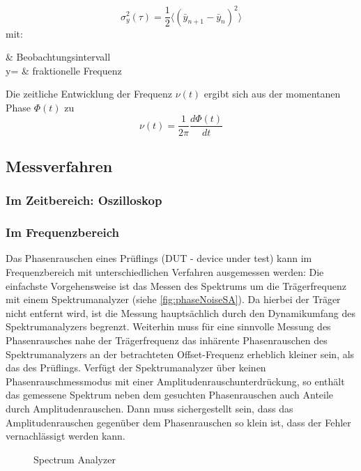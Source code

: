 \begin{equation}
	\sigma_y^2(\tau)=\frac{1}{2} \Big\langle(\bar{y}_{n+1}-\bar{y}_{n})^2\Big\rangle
\end{equation}
mit:
\begin{with*}
	\tau & Beobachtungsintervall \\
	y= & fraktionelle Frequenz \\
\end{with*}

Die zeitliche Entwicklung der Frequenz $\nu(t)$ ergibt sich aus der momentanen Phase $\Phi(t)$ zu 
\begin{equation}
	\nu(t)=\frac{1}{2\pi} \frac{d\Phi(t)}{dt}
\end{equation}


\subsection{Messverfahren}

\subsubsection{Im Zeitbereich: Oszilloskop}

\subsubsection{Im Frequenzbereich}
Das Phasenrauschen eines Prüflings (DUT - device under test) kann im Frequenzbereich mit unterschiedlichen Verfahren ausgemessen werden: Die einfachste Vorgehensweise ist das Messen des Spektrums um die Trägerfrequenz mit einem Spektrumanalyzer (siehe \autoref{fig:phaseNoiseSA}).
Da hierbei der Träger nicht entfernt wird, ist die Messung hauptsächlich durch den Dynamikumfang des Spektrumanalyzers begrenzt. Weiterhin muss für eine sinnvolle Messung des Phasenrausches nahe der Trägerfrequenz das inhärente Phasenrauschen des Spektrumanalyzers an der betrachteten Offset-Frequenz erheblich kleiner sein, als das des Prüflings. Verfügt der Spektrumanalyzer über keinen Phasenrauschmessmodus mit einer Amplitudenrauschunterdrückung, so enthält das gemessene Spektrum neben dem gesuchten Phasenrauschen auch Anteile durch Amplitudenrauschen. Dann muss sichergestellt sein, dass das Amplitudenrauschen gegenüber dem Phasenrauschen so klein ist, dass der Fehler vernachlässigt werden kann. 

\begin{figure}[H]
	\centering
	\caption[ph]{Spectrum Analyzer}
	\label{fig:phaseNoiseSA}
\end{figure}


